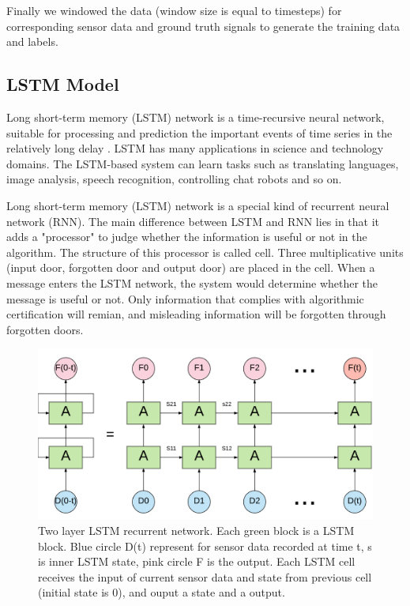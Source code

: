 \documentclass[11pt]{article}
\begin{document}
{Finally we windowed the data (window size is equal to timesteps) for corresponding sensor data and ground truth signals to generate the training data and labels.


\subsection{LSTM Model}
Long short-term memory (LSTM) network is a time-recursive neural network, suitable for processing and prediction the important events of time series in the relatively long delay . LSTM has many applications in science and technology domains. The LSTM-based system can learn tasks such as translating languages, image analysis, speech recognition, controlling chat robots and so on.

Long short-term memory (LSTM) network is a special kind of recurrent neural network (RNN). The main difference between LSTM and RNN lies in that it adds a "processor" to judge whether the information is useful or not in the algorithm. The structure of this processor is called cell.
Three multiplicative units (input door, forgotten door and output door) are placed in the cell. When a message enters the LSTM network, the system would determine whether the message is useful or not. Only information that complies with algorithmic certification will remian, and misleading information will be forgotten through forgotten doors.


\begin{figure}[ht]
\centering
\includegraphics[scale=0.3]{LSTM3}
\caption{Two layer LSTM recurrent network. Each green block is a LSTM block. Blue circle D(t) represent for sensor data recorded at time t, s is inner LSTM state, pink circle F is the output. Each LSTM cell receives the  input of current sensor data and state from previous cell (initial state is 0), and ouput a state  and a output.}
\label{fig:LSTM}
\end{figure}

}
\end{document}
